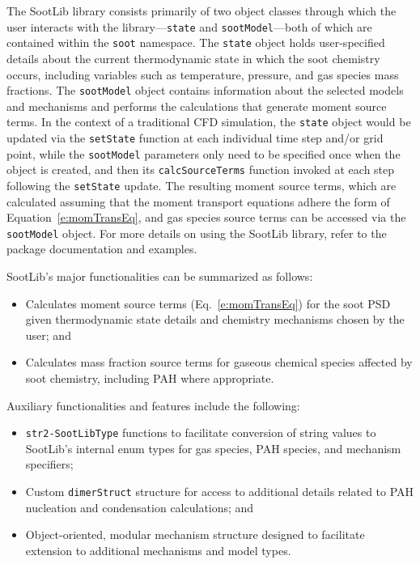 \documentclass[preprint,letterpaper]{elsarticle}
\begin{document}
The SootLib library consists primarily of two object classes through which the user interacts with the library---\texttt{state} and \texttt{sootModel}---both of which are contained within the \texttt{soot} namespace. The \texttt{state} object holds user-specified details about the current thermodynamic state in which the soot chemistry occurs, including variables such as temperature, pressure, and gas species mass fractions. The \texttt{sootModel} object contains information about the selected models and mechanisms and performs the calculations that generate moment source terms. In the context of a traditional CFD simulation, the \texttt{state} object would be updated via the \texttt{setState} function at each individual time step and/or grid point, while the \texttt{sootModel} parameters only need to be specified once when the object is created, and then its \texttt{calcSourceTerms} function invoked at each step following the \texttt{setState} update. The resulting moment source terms, which are calculated assuming that the moment transport equations adhere the form of Equation~\ref{e:momTransEq}, and gas species source terms can be accessed via the \texttt{sootModel} object. For more details on using the SootLib library, refer to the package documentation and examples.

SootLib's major functionalities can be summarized as follows:
\begin{itemize}
    \item Calculates moment source terms (Eq.~\ref{e:momTransEq}) for the soot PSD given thermodynamic state details and chemistry mechanisms chosen by the user; and
    \item Calculates mass fraction source terms for gaseous chemical species affected by soot chemistry, including PAH where appropriate.
\end{itemize}
Auxiliary functionalities and features include the following:
\begin{itemize}
    \item \texttt{str2-SootLibType} functions to facilitate conversion of string values to SootLib's internal enum types for gas species, PAH species, and mechanism specifiers;
    \item Custom \texttt{dimerStruct} structure for access to additional details related to PAH nucleation and condensation calculations; and
    \item Object-oriented, modular mechanism structure designed to facilitate extension to additional mechanisms and model types.
\end{itemize}
\end{document}
